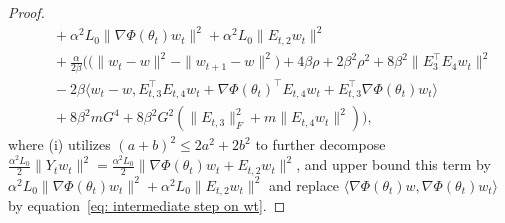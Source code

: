 \documentclass[twoside]{article} %
\def\eqref#1{equation~\ref{#1}}
\theoremstyle{plain}
\theoremstyle{definition}
\theoremstyle{remark}
\begin{document}
\begin{proof}
\begin{align}
    & \quad + \alpha^2L_0\|\nabla \Phi({\theta}_t){w}_t \|^2 + \alpha^2L_0\|E_{t,2}{w}_t\|^2 \nonumber\\
    &\quad +\frac{\alpha}{2\beta}\Big(\big(\|{w}_t -{w}\|^2-\|{w}_{t+1} -{w} \|^2 \big)+4\beta \rho + 2\beta^2\rho^2+8\beta^2 \|E_3^{\top} E_4{w}_t\|^2\nonumber\\
    & \quad -2\beta \langle {w}_t-{w}, E_{t,3}^{\top}E_{t,4}{w}_t+\nabla \Phi({\theta}_t)^{\top}E_{t,4}w_t+E_{t,3}^{\top}\nabla \Phi({\theta}_t){w}_t\rangle\nonumber\\
    &\quad + 8\beta^2 mG^4 + 8\beta^2G^2(\|E_{t,3} \|_F^2 +m\|E_{t,4} w_t\|^2 ) \Big),
    \label{eq: one step descent inequality}
\end{align}
where (i) utilizes $(a+b)^2\leq 2a^2+2b^2$ to further decompose $\frac{\alpha^2 L_0}{2}\|Y_tw_t \|^2=\frac{\alpha^2L_0}{2}\|\nabla\Phi(\theta_t)w_t+E_{t,2}w_t \|^2$, and upper bound this term by $\alpha^2L_0 \|\nabla \Phi(\theta_t)w_t\|^2+\alpha^2L_0\|E_{t,2}w_t\|^2$ and replace $\langle \nabla \Phi(\theta_t)w, \nabla \Phi(\theta_t)w_t\rangle$ by \eqref{eq: intermediate step on wt}.



\end{proof}
\end{document}
